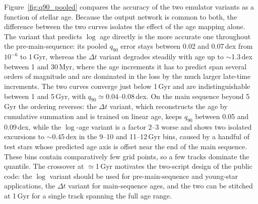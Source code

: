 
Figure~\ref{fig:q90_pooled} compares the accuracy of the two emulator variants as a function
of stellar age. Because the output network is common to both, the difference between the two
curves isolates the effect of the age mapping alone. The variant that predicts $\log$ age
directly is the more accurate one throughout the pre-main-sequence: its pooled $q_{90}$ error
stays between 0.02 and 0.07\,dex from $10^{-6}$ to 1\,Gyr, whereas the $\Delta t$ variant
degrades steadily with age up to $\sim$1.3\,dex between 1 and 30\,Myr, where the age
increments it has to predict span several orders of magnitude and are dominated in the loss by
the much larger late-time increments. The two curves converge just below 1\,Gyr and are
indistinguishable between 1 and 5\,Gyr, with $q_{90}\simeq0.04$--$0.08$\,dex. On the main
sequence beyond 5\,Gyr the ordering reverses: the $\Delta t$ variant, which reconstructs the
age by cumulative summation and is trained on linear age, keeps $q_{90}$ between 0.05 and
0.09\,dex, while the $\log$-age variant is a factor 2--3 worse and shows two isolated
excursions to $\sim$0.45\,dex in the 9--10 and 11--12\,Gyr bins, caused by a handful of test
stars whose predicted age axis is offset near the end of the main sequence. These bins contain
comparatively few grid points, so a few tracks dominate the quantile. The crossover at
$\simeq$1\,Gyr motivates the two-script design of the public code: the $\log$ variant should
be used for pre-main-sequence and young-star applications, the $\Delta t$ variant for
main-sequence ages, and the two can be stitched at 1\,Gyr for a single track spanning the full
age range.
